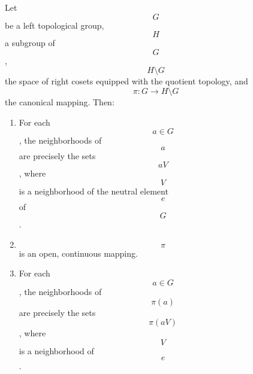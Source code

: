 Let $$G$$ be a left topological group, $$H$$ a subgroup of $$G$$, $$H \setminus G$$ the space of right cosets equipped with the quotient topology, and $$\pi: G \to H \setminus G$$ the canonical mapping. Then:
\begin{enumerate}
\item For each $$a \in G$$, the neighborhoods of $$a$$ are precisely the sets $$aV$$, where $$V$$ is a neighborhood of the neutral element $$e$$ of $$G$$.
\item $$\pi$$ is an open, continuous mapping.
\item For each $$a \in G$$, the neighborhoods of $$\pi(a)$$ are precisely the sets $$\pi(aV)$$, where $$V$$ is a neighborhood of $$e$$.
\end{enumerate}
